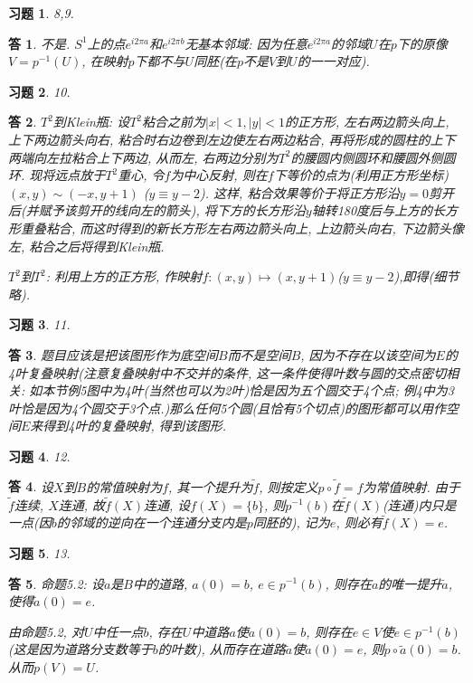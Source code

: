 \documentclass{ctexart}%
\newtheorem*{exercise}{习题}
\newtheorem*{solution}{答}
\theoremstyle{definition}
\theoremstyle{remark}
\begin{document}
 \begin{exercise}8,9.
 \end{exercise}
 \begin{solution}
 不是. $S^1$上的点$e^{i 2\pi a}$和$e^{i2\pi b}$无基本邻域: 因为任意$e^{i 2\pi a}$的邻域$U$在$p$下的原像$V=p^{-1}(U)$, 在映射$p$下都不与$U$同胚(在$p$不是$V$到$U$的一一对应).
 \end{solution} 

\begin{exercise}10.
\end{exercise}
\begin{solution}
$T^2$到Klein瓶: 设$T^2$粘合之前为$|x|<1,|y|<1$的正方形, 左右两边箭头向上, 上下两边箭头向右, 粘合时右边卷到左边使左右两边粘合, 再将形成的圆柱的上下两端向左拉粘合上下两边, 从而左, 右两边分别为$T^2$的腰圆内侧圆环和腰圆外侧圆环. 现将远点放于$T^2$重心, 令$f$为中心反射, 则在$f$下等价的点为(利用正方形坐标) $(x,y)\sim (-x,y+1)$ ($y\equiv y-2$). 这样, 粘合效果等价于将正方形沿$y=0$剪开后(并赋予该剪开的线向左的箭头), 将下方的长方形沿$y$轴转180度后与上方的长方形重叠粘合, 而这时得到的新长方形左右两边箭头向上, 上边箭头向右, 下边箭头像左, 粘合之后将得到Klein瓶. 

$T^2$到$T^2$: 利用上方的正方形, 作映射$f: (x,y)\mapsto (x,y+1)$($y\equiv y-2$),即得(细节略). 
\end{solution}

\begin{exercise}11.
\end{exercise}
\begin{solution}
题目应该是把该图形作为底空间$B$而不是空间$B$, 因为不存在以该空间为$E$的4叶复叠映射(注意复叠映射中不交并的条件, 这一条件使得叶数与圆的交点密切相关: 如本节例5图中为4叶(当然也可以为2叶)恰是因为五个圆交于4个点; 例4中为3叶恰是因为4个圆交于3个点.)那么任何5个圆(且恰有5个切点)的图形都可以用作空间$E$来得到4叶的复叠映射, 得到该图形.
\end{solution}

\begin{exercise}12.
\end{exercise}
\begin{solution}
设$X$到$B$的常值映射为$f$, 其一个提升为$\tilde{f}$, 则按定义$p\circ \tilde{f}=f$为常值映射. 由于$\tilde{f}$连续, $X$连通, 故$\tilde{f}(X)$连通, 设$f(X)=\{b\}$, 则$p^{-1}(b)$在$\tilde{f}(X)$(连通)内只是一点(因$b$的邻域的逆向在一个连通分支内是$p$同胚的), 记为$e$, 则必有$\tilde{f}(X)=e$.
\end{solution}

\begin{exercise}13.
\end{exercise}
\begin{solution}
命题5.2: 设$a$是$B$中的道路, $a(0)=b$, $e\in p^{-1}(b)$, 则存在$a$的唯一提升$\tilde{a}$, 使得$\tilde{a}(0)=e$. 

由命题5.2, 对$U$中任一点$b$, 存在$U$中道路$a$使$a(0)=b$, 则存在$e\in V$使$e\in p^{-1}(b)$(这是因为道路分支数等于$b$的叶数), 从而存在道路$\tilde{a}$使$\tilde{a}(0)=e$, 则$p\circ\tilde{a}(0)=b$. 从而$p(V)=U$.
\end{solution}
\end{document}
